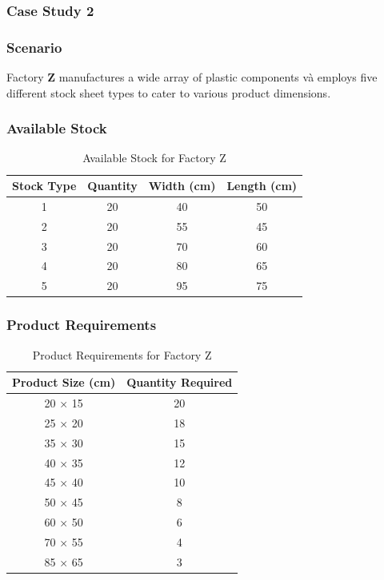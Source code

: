 \documentclass[a4paper]{article}
\begin{document}
\subsubsection{Case Study 2}

\subsubsection*{Scenario}
Factory \textbf{Z} manufactures a wide array of plastic components và employs five different stock sheet types to cater to various product dimensions.

\subsubsection*{Available Stock}
\begin{table}[H]
    \centering
    \caption{Available Stock for Factory Z}
    \begin{tabular}{|c|c|c|c|}
        \hline
        \textbf{Stock Type} & \textbf{Quantity} & \textbf{Width (cm)} & \textbf{Length (cm)} \\ \hline
        1 & 20 & 40 & 50 \\ \hline
        2 & 20 & 55 & 45 \\ \hline
        3 & 20 & 70 & 60 \\ \hline
        4 & 20 & 80 & 65 \\ \hline
        5 & 20 & 95 & 75 \\ \hline
    \end{tabular}
\end{table}

\subsubsection*{Product Requirements}
\begin{table}[H]
    \centering
    \caption{Product Requirements for Factory Z}
    \begin{tabular}{|c|c|}
        \hline
        \textbf{Product Size (cm)} & \textbf{Quantity Required} \\ \hline
        20 × 15 & 20 \\ \hline
        25 × 20 & 18 \\ \hline
        35 × 30 & 15 \\ \hline
        40 × 35 & 12 \\ \hline
        45 × 40 & 10 \\ \hline
        50 × 45 & 8 \\ \hline
        60 × 50 & 6 \\ \hline
        70 × 55 & 4 \\ \hline
        85 × 65 & 3 \\ \hline
    \end{tabular}
\end{table}
\end{document}
